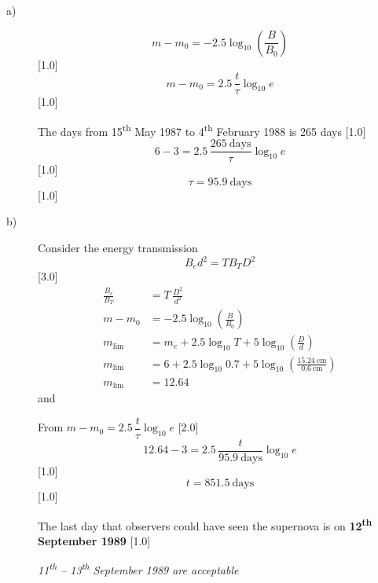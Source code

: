 \begin{description}
\item[a)]
  \[ m - m_0 = -2.5\log_{10}\left(\frac{B}{B_0}\right) \]
  \hfill[1.0]
  \[ m - m_0 = 2.5\,\frac{t}{\tau}\log_{10} e \]
  \hfill[1.0]

  The days from 15\textsuperscript{th} May 1987 to 4\textsuperscript{th}
  February 1988 is 265 days \hfill[1.0]
  \[ 6 - 3 = 2.5\,\frac{265\ \mathrm{days}}{\tau}\log_{10} e \]
  \hfill[1.0]
  \[ \tau = 95.9\ \mathrm{days} \]
  \hfill[1.0]
\item[b)]
  Consider the energy transmission
  \[ B_e d^2 = T B_T D^2 \]
  \hfill[3.0]
  \begin{align*}
  \frac{B_e}{B_T} &= T\,\frac{D^2}{d^2}\\
  m - m_0 &= -2.5\log_{10}\left(\frac{B}{B_0}\right)
    \tag*{[1.0]}\\
  m_{\mathrm{lim}} &= m_e + 2.5\log_{10} T
    + 5\log_{10}\left(\frac{D}{d}\right)
    \tag*{[1.0]}\\
  m_{\mathrm{lim}} &= 6 + 2.5\log_{10} 0.7
    + 5\log_{10}\left(\frac{15.24\ \mathrm{cm}}{0.6\ \mathrm{cm}}\right)\\
  m_{\mathrm{lim}} &= 12.64
  \end{align*}
  and

  From $m - m_0 = 2.5\,\dfrac{t}{\tau}\log_{10} e$ \hfill[2.0]
  \[ 12.64 - 3 = 2.5\,\frac{t}{95.9\ \mathrm{days}}\log_{10} e \]
  \hfill[1.0]
  \[ t = 851.5\ \mathrm{days} \]
  \hfill[1.0]

  The last day that observers could have seen the supernova is on
  \textbf{12\textsuperscript{th} September 1989} \hfill[1.0]

  \emph{11\textsuperscript{th} -- 13\textsuperscript{th} September 1989 are
  acceptable}
\end{description}
